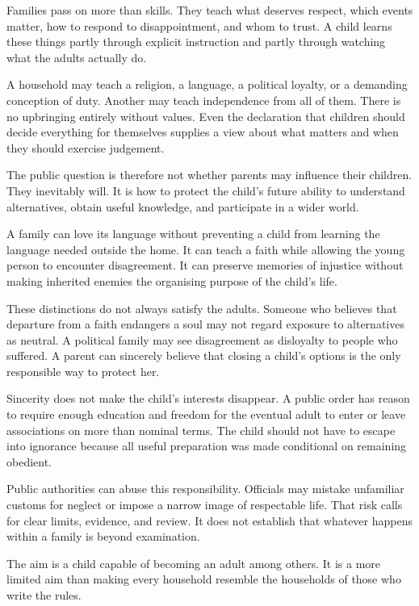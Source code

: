\documentclass[12pt,a4paper]{book}
\begin{document}
Families pass on more than skills. They teach what deserves respect, which events matter, how to respond to disappointment, and whom to trust. A child learns these things partly through explicit instruction and partly through watching what the adults actually do.

A household may teach a religion, a language, a political loyalty, or a demanding conception of duty. Another may teach independence from all of them. There is no upbringing entirely without values. Even the declaration that children should decide everything for themselves supplies a view about what matters and when they should exercise judgement.

The public question is therefore not whether parents may influence their children. They inevitably will. It is how to protect the child's future ability to understand alternatives, obtain useful knowledge, and participate in a wider world.

A family can love its language without preventing a child from learning the language needed outside the home. It can teach a faith while allowing the young person to encounter disagreement. It can preserve memories of injustice without making inherited enemies the organising purpose of the child's life.

These distinctions do not always satisfy the adults. Someone who believes that departure from a faith endangers a soul may not regard exposure to alternatives as neutral. A political family may see disagreement as disloyalty to people who suffered. A parent can sincerely believe that closing a child's options is the only responsible way to protect her.

Sincerity does not make the child's interests disappear. A public order has reason to require enough education and freedom for the eventual adult to enter or leave associations on more than nominal terms. The child should not have to escape into ignorance because all useful preparation was made conditional on remaining obedient.

Public authorities can abuse this responsibility. Officials may mistake unfamiliar customs for neglect or impose a narrow image of respectable life. That risk calls for clear limits, evidence, and review. It does not establish that whatever happens within a family is beyond examination.

The aim is a child capable of becoming an adult among others. It is a more limited aim than making every household resemble the households of those who write the rules.
\end{document}
